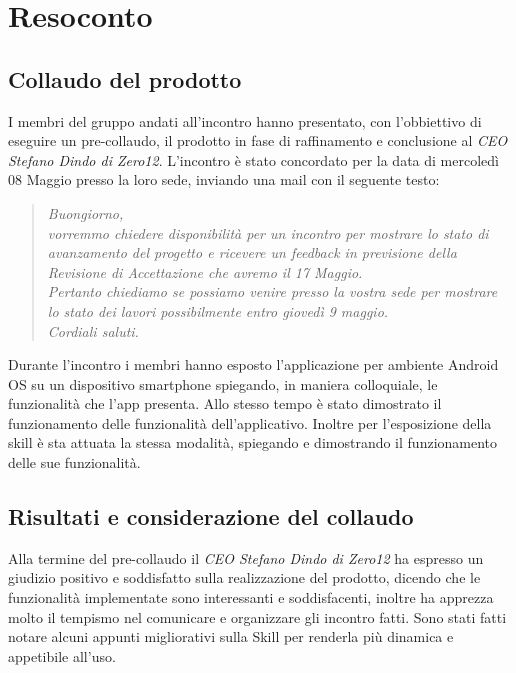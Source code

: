 \clearpage
\section{Resoconto}
	\subsection{Collaudo del prodotto}
	\label{sec:collaudo}
	I membri del gruppo andati all'incontro hanno presentato, con l'obbiettivo di eseguire un pre-collaudo, il prodotto in fase di raffinamento e conclusione al \emph{CEO Stefano Dindo di Zero12}. L'incontro è stato concordato per la data di mercoledì 08 Maggio presso la loro sede, inviando una mail con il seguente testo:
	\begin{quote}
		\emph{Buongiorno,\\[0.25cm]vorremmo chiedere disponibilità per un incontro per mostrare lo stato di avanzamento del progetto e ricevere un feedback in previsione della Revisione di Accettazione che avremo il 17 Maggio.\\Pertanto chiediamo se possiamo venire presso la vostra sede per mostrare lo stato dei lavori possibilmente entro giovedì 9 maggio.\\Cordiali saluti.
		}
	\end{quote}
	Durante l'incontro i membri hanno esposto l'applicazione per ambiente Android OS su un dispositivo smartphone spiegando, in maniera colloquiale, le funzionalità che l'app presenta. Allo stesso tempo è stato dimostrato il funzionamento delle funzionalità dell'applicativo. Inoltre per l'esposizione della skill è sta attuata la stessa modalità, spiegando e dimostrando il funzionamento delle sue funzionalità.
	\subsection{Risultati e considerazione del collaudo}
	\label{sec:feedback}
	Alla termine del pre-collaudo il \emph{CEO Stefano Dindo di Zero12} ha espresso un giudizio positivo e soddisfatto sulla realizzazione del prodotto, dicendo che le funzionalità implementate sono interessanti e soddisfacenti, inoltre ha apprezza molto il tempismo nel comunicare e organizzare gli incontro fatti. Sono stati fatti notare alcuni appunti migliorativi sulla Skill per renderla più dinamica e appetibile all'uso.
